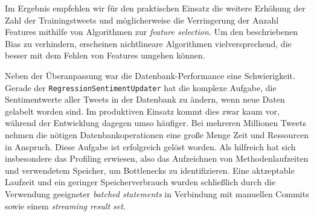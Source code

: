 Im Ergebnis empfehlen wir für den praktischen Einsatz die weitere Erhöhung der Zahl der Trainingstweets und möglicherweise die Verringerung der Anzahl Features mithilfe von Algorithmen zur \textit{feature selection}. Um den beschriebenen Bias zu verhindern, erscheinen nichtlineare Algorithmen vielversprechend, die besser mit dem Fehlen von Features umgehen können.

Neben der Überanpassung war die Datenbank-Performance eine Schwierigkeit. Gerade der \texttt{Regression\-Sentiment\-Updater} hat die komplexe Aufgabe, die Sentimentwerte aller Tweets in der Datenbank zu ändern, wenn neue Daten gelabelt worden sind. Im produktiven Einsatz kommt dies zwar kaum vor, während der Entwicklung dagegen umso häufiger. Bei mehreren Millionen Tweets nehmen die nötigen Datenbankoperationen eine große Menge Zeit und Ressourcen in Anspruch. Diese Aufgabe ist erfolgreich gelöst worden. Als hilfreich hat sich insbesondere das Profiling erwiesen, also das Aufzeichnen von Methodenlaufzeiten und verwendetem Speicher, um Bottlenecks zu identifizieren. Eine aktzeptable Laufzeit und ein geringer Speicherverbrauch wurden schließlich durch die Verwendung geeigneter \textit{batched statements} in Verbindung mit manuellen Commits sowie einem \textit{streaming result set}.
